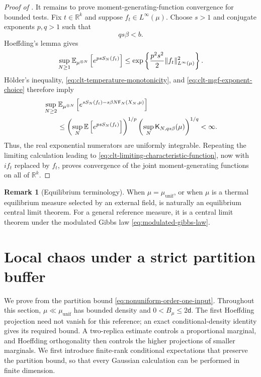 \documentclass[11pt,reqno]{amsart}
\numberwithin{equation}{section}
\theoremstyle{plain}
\theoremstyle{definition}
\newtheorem{remark}[remark]{Remark}
\DeclarePairedDelimiter{\norm}{\lVert}{\rVert}
\renewcommand{\d}{\mathsf d}
\newcommand{\R}{\mathbb R}
\newcommand{\E}{\mathbb E}
\newcommand{\be}{\beta}
\newcommand{\K}{\mathsf K}
\newcommand{\Fr}{\mathsf F}
\newcommand{\muunif}{\mu_{\mathrm{unif}}}
\newcommand{\XN}{X_N}
\begin{document}
\begin{proof}[Proof of ]
It remains to prove moment-generating-function convergence for bounded tests.  Fix $t\in\R^k$ and suppose $f_t\in L^\infty(\mu)$.  Choose $s>1$ and conjugate exponents $p,q>1$ such that
\begin{equation}
 qs\be<b.
 \label{eq:clt-mgf-exponent-choice}
\end{equation}
Hoeffding's lemma gives
\begin{equation}
 \sup_{N\geq1}
 \E_{\mu^{\otimes N}}
 \left[e^{psS_N(f_t)}\right]
 \leq\exp\left\{\frac{p^2s^2}{2}\norm{f_t}_{L^\infty(\mu)}^2\right\}.
 \label{eq:clt-product-mgf-bound}
\end{equation}
H\"older's inequality, \eqref{eq:clt-temperature-monotonicity}, and \eqref{eq:clt-mgf-exponent-choice} therefore imply
\begin{align}
 &\sup_{N\geq2}
 \E_{\mu^{\otimes N}}
 \left[e^{sS_N(f_t)-s\be N\Fr_N(\XN,\mu)}\right]
 \notag\\
 &\qquad\leq
 \left(\sup_N\E\left[e^{psS_N(f_t)}\right]\right)^{1/p}
 \left(\sup_N \K_{N,qs\be}(\mu)\right)^{1/q}<\infty.
 \label{eq:clt-mgf-uniform-integrability}
\end{align}
Thus, the real exponential numerators are uniformly integrable.  Repeating the limiting calculation leading to \eqref{eq:clt-limiting-characteristic-function}, now with $i f_t$ replaced by $f_t$, proves convergence of the joint moment-generating functions on all of $\R^k$.
\end{proof}

\begin{remark}[Equilibrium terminology]
When $\mu=\muunif$, or when $\mu$ is a thermal equilibrium measure selected by an external field,  is naturally an equilibrium central limit theorem.  For a general reference measure, it is a central limit theorem under the modulated Gibbs law \eqref{eq:modulated-gibbs-law}.
\end{remark}

\section{Local chaos under a strict partition buffer}
\label{sec:local-chaos}

We prove  from the partition bound \eqref{eq:nonuniform-order-one-input}. Throughout this section, $\mu\ll\muunif$ has bounded density and $0<B_\mu\leq2\d$. The first Hoeffding projection need not vanish for this reference; an exact conditional-density identity gives its required bound. A two-replica estimate controls a proportional marginal, and Hoeffding orthogonality then controls the higher projections of smaller marginals. We first introduce finite-rank conditional expectations that preserve the partition bound, so that every Gaussian calculation can be performed in finite dimension.
\end{document}
